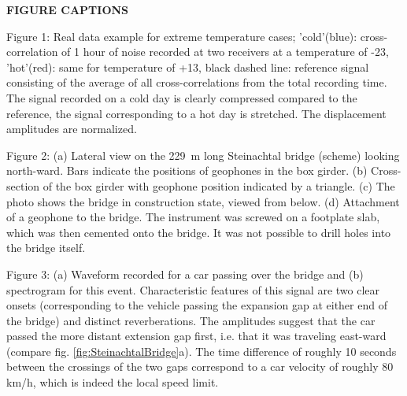 \documentclass[12pt,reqno]{article} %
\begin{document}
%
%



\newpage

\noindent
{\large \textbf{FIGURE CAPTIONS}}

\noindent
Figure 1: Real data example for extreme temperature cases; 'cold'(blue): cross-correlation of 1 hour of noise recorded at two receivers at a temperature of -23, 'hot'(red): same for temperature of +13, black dashed line: reference signal consisting of the average of all cross-correlations from the total recording time. The signal recorded on a cold day is clearly compressed compared to the reference, the signal corresponding to a hot day is stretched. The displacement amplitudes are normalized.

\noindent
Figure 2: (a) Lateral view on the 229~m long Steinachtal bridge (scheme) looking north-ward. Bars indicate the positions of geophones in the box girder. (b) Cross-section of the box girder with geophone position indicated by a triangle. (c) The photo shows the bridge in construction state, viewed from below. (d) Attachment of a geophone to the bridge. The instrument was screwed on a footplate slab, which was then cemented onto the bridge. It was not possible to drill holes into the bridge itself.

\noindent
Figure 3: (a) Waveform recorded for a car passing over the bridge and (b) spectrogram for this event. Characteristic features of this signal are two clear onsets (corresponding to the vehicle passing the expansion gap at either end of the bridge) and distinct reverberations. The amplitudes suggest that the car passed the more distant extension gap first, i.e. that it was traveling east-ward (compare fig. \ref{fig:SteinachtalBridge}a). The time difference of roughly 10 seconds between the crossings of the two gaps correspond to a car velocity of roughly 80 km/h, which is indeed the local speed limit.


\noindent   
\noindent   
\end{document}
